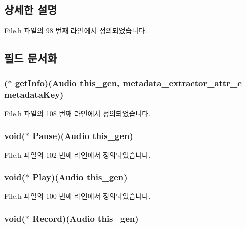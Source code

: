 \subsection{상세한 설명}


File.\-h 파일의 98 번째 라인에서 정의되었습니다.



\subsection{필드 문서화}
\hypertarget{struct___audio_af557af230def744c4b3ed69d5b3c2076}{
\subsubsection[{get\-Info}]{($\ast$  get\-Info)({\bf Audio} this\-\_\-gen, metadata\-\_\-extractor\-\_\-attr\-\_\-e metadata\-Key)}}\label{struct___audio_af557af230def744c4b3ed69d5b3c2076}


File.\-h 파일의 108 번째 라인에서 정의되었습니다.

\hypertarget{struct___audio_a3d78751cda929e033894cbd9f552ae8e}{
\subsubsection[{Pause}]{\setlength{\rightskip}{0pt plus 5cm}void($\ast$  Pause)({\bf Audio} this\-\_\-gen)}}\label{struct___audio_a3d78751cda929e033894cbd9f552ae8e}


File.\-h 파일의 102 번째 라인에서 정의되었습니다.

\hypertarget{struct___audio_a406855bb5ad50dfefae012be99b06cde}{
\subsubsection[{Play}]{\setlength{\rightskip}{0pt plus 5cm}void($\ast$  Play)({\bf Audio} this\-\_\-gen)}}\label{struct___audio_a406855bb5ad50dfefae012be99b06cde}


File.\-h 파일의 100 번째 라인에서 정의되었습니다.

\hypertarget{struct___audio_abcf52f46187e6c2e2fbc5bd8512adad1}{
\subsubsection[{Record}]{\setlength{\rightskip}{0pt plus 5cm}void($\ast$  Record)({\bf Audio} this\-\_\-gen)}}\label{struct___audio_abcf52f46187e6c2e2fbc5bd8512adad1}


